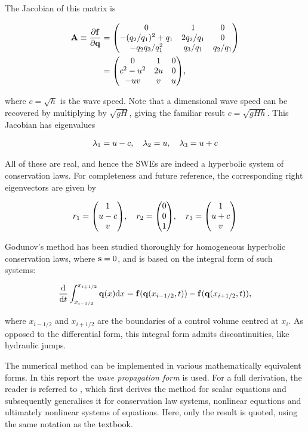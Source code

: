The Jacobian of this matrix is

\begin{align}
  \vb A \equiv \pdv{\vb f}{\vb q} &= \mqty(
    0 & 1 & 0 \\
    - (q_2/q_1)^2 + q_1 & 2 q_2/q_1 & 0 \\
    - q_2q_3/q_1^2 & q_3/q_1 & q_2/q_1
  ) \\
  &= \mqty(
    0 & 1 & 0 \\
    c^2 - u^2 & 2u & 0 \\
    -uv & v & u
  ), \label{eq:swe_jacobian}
\end{align}

where $c = \sqrt{h}$ is the wave speed. Note that a dimensional wave speed can be recovered by multiplying by $\sqrt{gH}$, giving the familiar result $c = \sqrt{gHh}$. This Jacobian has eigenvalues

\begin{align}
  \lambda_1 = u - c \qc \lambda_2 = u \qc \lambda_3 = u + c
\end{align}

All of these are real, and hence the SWEs are indeed a hyperbolic system of conservation laws. For completeness and future reference, the corresponding right eigenvectors are given by

\begin{align}
  r_1 = \mqty(1 \\ u - c \\ v) \qc
  r_2 = \mqty(0 \\ 0 \\ 1) \qc
  r_3 = \mqty(1 \\ u + c \\ v)
\end{align}

Godunov's method has been studied thoroughly for homogeneous hyperbolic conservation laws, where $\vb s = 0$, and is based on the integral form of such systems:

\begin{align}
  \label{eq:claw_integral}
  \dv{t} \int_{x_{i-1/2}}^{x_{i+1/2}} \vb q(x) \dd x = \vb f(\vb q(x_{i-1/2},t)) - \vb f(\vb q(x_{i+1/2},t)),
\end{align}

where $x_{i-1/2}$ and $x_{i+1/2}$ are the boundaries of a control volume centred at $x_i$. As opposed to the differential form, this integral form admits discontinuities, like hydraulic jumps.

The numerical method can be implemented in various mathematically equivalent forms. In this report the \emph{wave propagation form} is used. For a full derivation, the reader is referred to \cite{leveque2002finite}, which first derives the method for scalar equations and subsequently generalises it for conservation law systems, nonlinear equations and ultimately nonlinear systems of equations. Here, only the result is quoted, using the same notation as the textbook.

